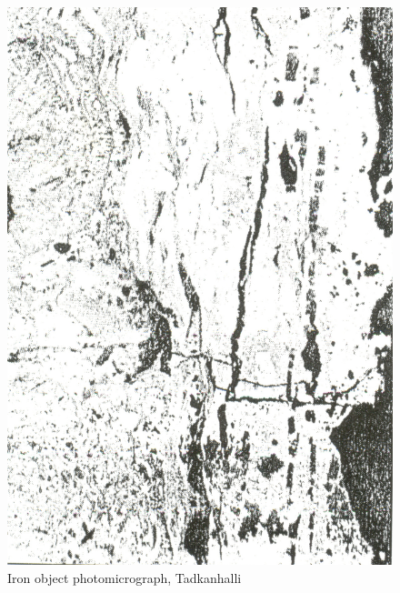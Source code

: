 \begin{figure}[H]
\renewcommand{\thefigure}{17D}
\includegraphics[scale=0.75]{images/chapter-4/fig017D.jpg}
\caption{Iron object photomicrograph, Tadkanhalli}\label{chapter-4-fig17D}
\end{figure}

\newpage

